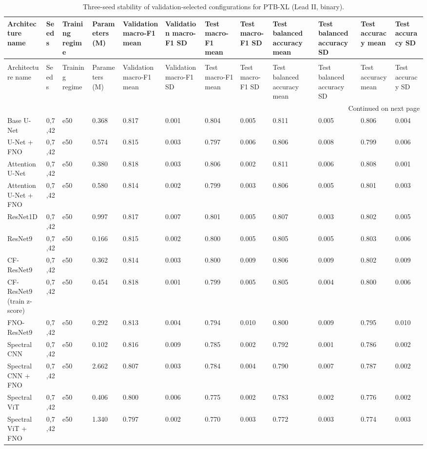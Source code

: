 \begin{longtable}{llllllllllll}
\caption{Three-seed stability of validation-selected configurations for PTB-XL (Lead II, binary).} \label{tab:ptbxl_leadii_binary_seed_stability} \\
\toprule
Architecture name & Seeds & Training regime & Parameters (M) & Validation macro-F1 mean & Validation macro-F1 SD & Test macro-F1 mean & Test macro-F1 SD & Test balanced accuracy mean & Test balanced accuracy SD & Test accuracy mean & Test accuracy SD \\
\midrule
\endfirsthead
\caption[]{Three-seed stability of validation-selected configurations for PTB-XL (Lead II, binary).} \\
\toprule
Architecture name & Seeds & Training regime & Parameters (M) & Validation macro-F1 mean & Validation macro-F1 SD & Test macro-F1 mean & Test macro-F1 SD & Test balanced accuracy mean & Test balanced accuracy SD & Test accuracy mean & Test accuracy SD \\
\midrule
\endhead
\midrule
\multicolumn{12}{r}{Continued on next page} \\
\midrule
\endfoot
\bottomrule
\endlastfoot
Base U-Net & 0,7,42 & e50 & 0.368 & 0.817 & 0.001 & 0.804 & 0.005 & 0.811 & 0.005 & 0.806 & 0.004 \\
U-Net + FNO & 0,7,42 & e50 & 0.574 & 0.815 & 0.003 & 0.797 & 0.006 & 0.806 & 0.008 & 0.799 & 0.006 \\
Attention U-Net & 0,7,42 & e50 & 0.380 & 0.818 & 0.003 & 0.806 & 0.002 & 0.811 & 0.006 & 0.808 & 0.001 \\
Attention U-Net + FNO & 0,7,42 & e50 & 0.580 & 0.814 & 0.002 & 0.799 & 0.003 & 0.806 & 0.005 & 0.801 & 0.003 \\
ResNet1D & 0,7,42 & e50 & 0.997 & 0.817 & 0.007 & 0.801 & 0.005 & 0.807 & 0.003 & 0.802 & 0.005 \\
ResNet9 & 0,7,42 & e50 & 0.166 & 0.815 & 0.002 & 0.800 & 0.005 & 0.805 & 0.005 & 0.803 & 0.006 \\
CF-ResNet9 & 0,7,42 & e50 & 0.362 & 0.814 & 0.003 & 0.800 & 0.009 & 0.806 & 0.009 & 0.802 & 0.009 \\
CF-ResNet9 (train z-score) & 0,7,42 & e50 & 0.454 & 0.818 & 0.001 & 0.799 & 0.005 & 0.805 & 0.004 & 0.800 & 0.006 \\
FNO-ResNet9 & 0,7,42 & e50 & 0.292 & 0.813 & 0.004 & 0.794 & 0.010 & 0.800 & 0.009 & 0.795 & 0.010 \\
Spectral CNN & 0,7,42 & e50 & 0.102 & 0.816 & 0.009 & 0.785 & 0.002 & 0.792 & 0.001 & 0.786 & 0.002 \\
Spectral CNN + FNO & 0,7,42 & e50 & 2.662 & 0.807 & 0.003 & 0.784 & 0.004 & 0.790 & 0.007 & 0.787 & 0.002 \\
Spectral ViT & 0,7,42 & e50 & 0.406 & 0.800 & 0.006 & 0.775 & 0.002 & 0.783 & 0.002 & 0.776 & 0.002 \\
Spectral ViT + FNO & 0,7,42 & e50 & 1.340 & 0.797 & 0.002 & 0.770 & 0.003 & 0.772 & 0.003 & 0.774 & 0.003 \\
\end{longtable}
